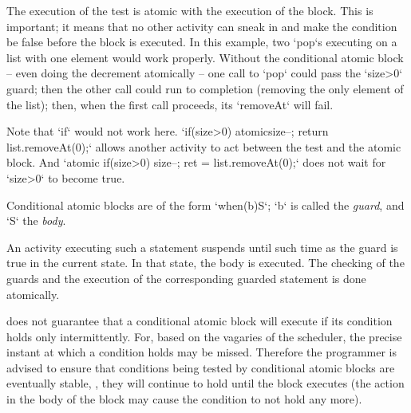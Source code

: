 The execution of the test is atomic with the execution of the block.  This is
important; it means that no other activity can sneak in and make the condition
be false before the block is executed.  In this example, two \xcd`pop`s
executing on a list with one element would work properly. Without the
conditional atomic block -- even doing the decrement atomically -- one call to
\xcd`pop` could pass the \xcd`size>0` guard; then the other call could run to
completion (removing the only element of the list); then, when the first call
proceeds, its \xcd`removeAt` will fail.  

Note that \xcd`if` would not work here.  
\xcd`if(size>0) atomic{size--; return list.removeAt(0);}` allows another
activity to act between the test and the atomic block.  
And 
\xcd`atomic{ if(size>0) {size--; ret = list.removeAt(0);}}` 
does not wait for \xcd`size>0` to become true.


Conditional atomic blocks are of the form \xcd`when(b)S`; 
\xcd`b` is called the {\em guard}, and \xcd`S` the {\em body}.

An activity executing such a statement suspends until such time as the  guard
is true in the current state. In that state, the 
body is executed. 
The checking of the guards and the execution of the corresponding
guarded statement is done atomically. 

\Xten{} does not guarantee that a conditional atomic block
will execute if its condition holds only intermittently. For, based on
the vagaries of the scheduler, the precise instant at which a
condition holds may be missed. Therefore the programmer is advised to
ensure that conditions being tested by conditional atomic blocks are
eventually stable, \ie, they will continue to hold until the block
executes (the action in the body of the block may cause the condition
to not hold any more).




